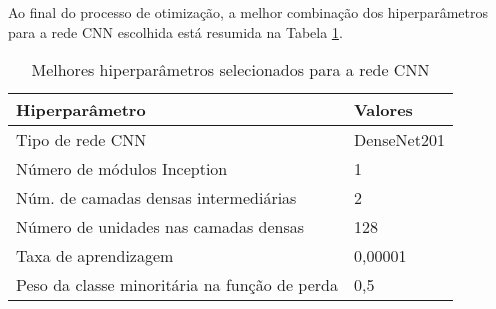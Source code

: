 Ao final do processo de otimização, a melhor combinação dos hiperparâmetros para a rede CNN escolhida está resumida na Tabela \ref{table:met_best_hpo_cnn}.

\begin{table}[]
\centering
\caption{Melhores hiperparâmetros selecionados para a rede CNN}
\label{table:met_best_hpo_cnn}
\begin{tabular}{@{}ll@{}}
\toprule
Hiperparâmetro                        & Valores     \\ \midrule
Tipo de rede CNN                      & DenseNet201 \\
Número de módulos Inception           & 1           \\
Núm. de camadas densas intermediárias & 2           \\
Número de unidades nas camadas densas & 128         \\
Taxa de aprendizagem                  & 0,00001     \\
Peso da classe minoritária na função de perda   & 0,5         \\ \bottomrule
\end{tabular}
\end{table}



